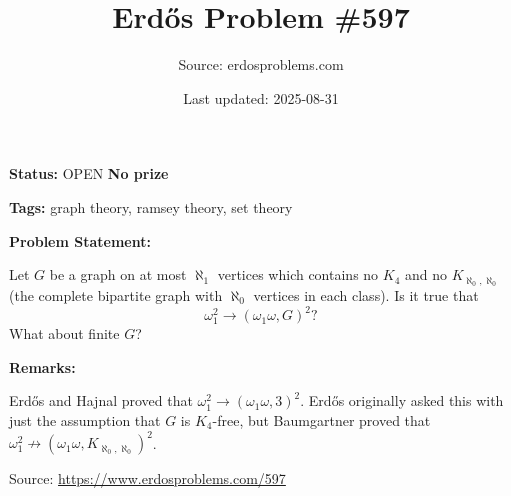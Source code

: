 \documentclass{article}
\title{Erd\H{o}s Problem \#597}
\date{Last updated: 2025-08-31}
\author{Source: erdosproblems.com}
\begin{document}
\maketitle

\noindent\textbf{Status:} OPEN \quad \textbf{No prize}

\noindent\textbf{Tags:} graph theory, ramsey theory, set theory

\medskip
\noindent\textbf{Problem Statement:}

Let $G$ be a graph on at most $\aleph_1$ vertices which contains no $K_4$ and no $K_{\aleph_0,\aleph_0}$ (the complete bipartite graph with $\aleph_0$ vertices in each class). Is it true that\[\omega_1^2 \to (\omega_1\omega, G)^2?\]What about finite $G$?

\bigskip
\noindent\textbf{Remarks:}

Erd\H{o}s and Hajnal proved that $\omega_1^2 \to (\omega_1\omega,3)^2$. Erd\H{o}s originally asked this with just the assumption that $G$ is $K_4$-free, but Baumgartner proved that $\omega_1^2 \not\to (\omega_1\omega, K_{\aleph_0,\aleph_0})^2$.

\bigskip
\noindent\small{Source: \url{https://www.erdosproblems.com/597}}
\end{document}

